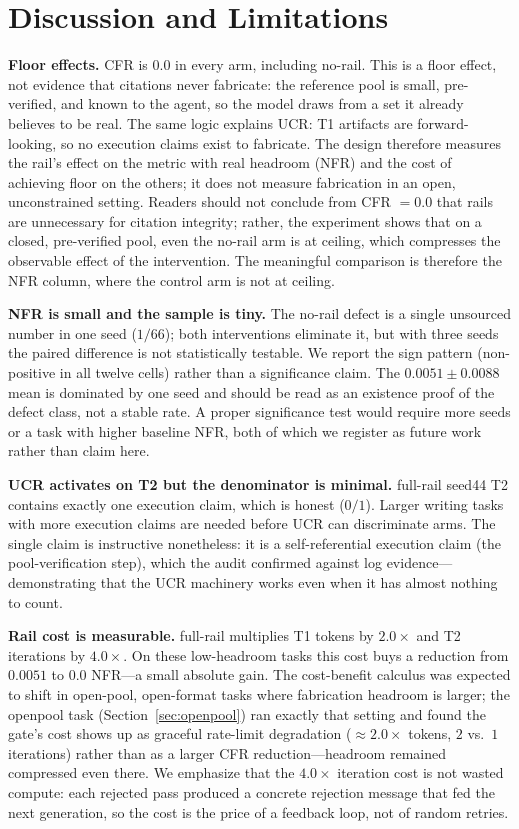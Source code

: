 \documentclass[10pt,twocolumn]{article}
\begin{document}
\section{Discussion and Limitations}
\label{sec:discussion}

\textbf{Floor effects.} CFR is $0.0$ in every arm, including no-rail. This is a floor effect, not evidence that citations never fabricate: the reference pool is small, pre-verified, and known to the agent, so the model draws from a set it already believes to be real. The same logic explains UCR: T1 artifacts are forward-looking, so no execution claims exist to fabricate. The design therefore measures the rail's effect on the metric with real headroom (NFR) and the cost of achieving floor on the others; it does not measure fabrication in an open, unconstrained setting. Readers should not conclude from CFR $= 0.0$ that rails are unnecessary for citation integrity; rather, the experiment shows that on a closed, pre-verified pool, even the no-rail arm is at ceiling, which compresses the observable effect of the intervention. The meaningful comparison is therefore the NFR column, where the control arm is not at ceiling.

\textbf{NFR is small and the sample is tiny.} The no-rail defect is a single unsourced number in one seed ($1/66$); both interventions eliminate it, but with three seeds the paired difference is not statistically testable. We report the sign pattern (non-positive in all twelve cells) rather than a significance claim. The $0.0051 \pm 0.0088$ mean is dominated by one seed and should be read as an existence proof of the defect class, not a stable rate. A proper significance test would require more seeds or a task with higher baseline NFR, both of which we register as future work rather than claim here.

\textbf{UCR activates on T2 but the denominator is minimal.} full-rail seed44 T2 contains exactly one execution claim, which is honest ($0/1$). Larger writing tasks with more execution claims are needed before UCR can discriminate arms. The single claim is instructive nonetheless: it is a self-referential execution claim (the pool-verification step), which the audit confirmed against log evidence---demonstrating that the UCR machinery works even when it has almost nothing to count.

\textbf{Rail cost is measurable.} full-rail multiplies T1 tokens by $2.0\times$ and T2 iterations by $4.0\times$. On these low-headroom tasks this cost buys a reduction from $0.0051$ to $0.0$ NFR---a small absolute gain. The cost-benefit calculus was expected to shift in open-pool, open-format tasks where fabrication headroom is larger; the openpool task (Section~\ref{sec:openpool}) ran exactly that setting and found the gate's cost shows up as graceful rate-limit degradation ($\approx 2.0\times$ tokens, $2$ vs.\ $1$ iterations) rather than as a larger CFR reduction---headroom remained compressed even there. We emphasize that the $4.0\times$ iteration cost is not wasted compute: each rejected pass produced a concrete rejection message that fed the next generation, so the cost is the price of a feedback loop, not of random retries.
\end{document}
